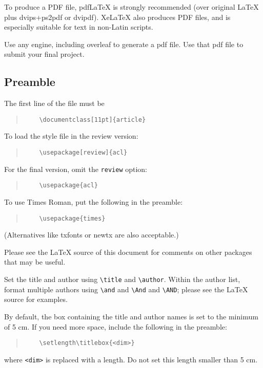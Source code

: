 \documentclass[11pt]{article}
\begin{document}
To produce a PDF file, pdf\LaTeX{} is strongly recommended (over original \LaTeX{} plus dvips+ps2pdf or dvipdf). Xe\LaTeX{} also produces PDF files, and is especially suitable for text in non-Latin scripts.

Use any engine, including overleaf to generate a pdf file. Use that pdf file to submit your final project.

\subsection{Preamble}

The first line of the file must be
\begin{quote}
	\begin{verbatim}
	\documentclass[11pt]{article}
	\end{verbatim}
\end{quote}

To load the style file in the review version:
\begin{quote}
	\begin{verbatim}
	\usepackage[review]{acl}
	\end{verbatim}
\end{quote}
For the final version, omit the \verb|review| option:
\begin{quote}
	\begin{verbatim}
	\usepackage{acl}
	\end{verbatim}
\end{quote}

To use Times Roman, put the following in the preamble:
\begin{quote}
	\begin{verbatim}
	\usepackage{times}
	\end{verbatim}
\end{quote}
(Alternatives like txfonts or newtx are also acceptable.)

Please see the \LaTeX{} source of this document for comments on other packages that may be useful.

Set the title and author using \verb|\title| and \verb|\author|. Within the author list, format multiple authors using \verb|\and| and \verb|\And| and \verb|\AND|; please see the \LaTeX{} source for examples.

By default, the box containing the title and author names is set to the minimum of 5 cm. If you need more space, include the following in the preamble:
\begin{quote}
	\begin{verbatim}
	\setlength\titlebox{<dim>}
	\end{verbatim}
\end{quote}
where \verb|<dim>| is replaced with a length. Do not set this length smaller than 5 cm.
\end{document}

